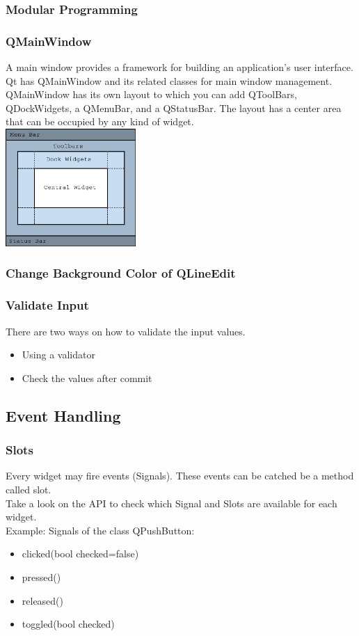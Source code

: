\begin{frame}[fragile]
	\frametitle{Modular Programming}
	{\tiny
	
	}
\end{frame}

\frame
{
	\frametitle{QMainWindow}
	A main window provides a framework for building an application's user interface.
	Qt has QMainWindow and its related classes for main window management.
	QMainWindow has its own layout to which you can add QToolBars, QDockWidgets,
	a QMenuBar, and a QStatusBar. The layout has a center area that can be occupied
	by any kind of widget.\\
	\includegraphics[width=140pt]{img/mainwindowlayout.png}

}

\frame
{
	\frametitle{Change Background Color of QLineEdit}
	
}

\frame
{
	\frametitle{Validate Input}
	There are two ways on how to validate the input values.
	\begin{itemize}
	\item Using a validator
	{\tiny
	
	}
	\item Check the values after commit
	{\tiny
	
	}
	\end{itemize}
}


\subsection{Event Handling}
\frame
{
	\frametitle{Slots}
	Every widget may fire events (Signals). These events can be catched be a method
	called slot.\\
	Take a look on the API to check which Signal and Slots are available for each
	widget.\\
	Example: Signals of the class QPushButton:
	\begin{itemize}
	\item clicked(bool checked=false)
	\item pressed()
	\item released()
	\item toggled(bool checked)
	\end{itemize}
}

